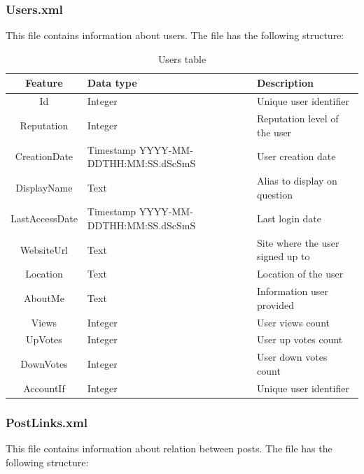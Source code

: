 \documentclass[11pt]{article} %
\begin{document}
    \subsubsection{Users.xml}

      This file contains information about users. The file has the following structure:

      \begin{table}[!h]
        \begin{tabular}{|c|p{}|p{}|}
          \hline

          Feature & Data type & Description \\ \hline
          Id & Integer & Unique user identifier \\
          Reputation & Integer & Reputation level of the user \\ \hline
          CreationDate & Timestamp YYYY-MM-DDTHH:MM:SS.dScSmS & User creation date \\ \hline
          DisplayName & Text & Alias to display on question \\ \hline
          LastAccessDate & Timestamp YYYY-MM-DDTHH:MM:SS.dScSmS & Last login date \\ \hline
          WebsiteUrl & Text & Site where the user signed up to \\ \hline
          Location & Text & Location of the user \\ \hline
          AboutMe & Text & Information user provided \\ \hline
          Views & Integer & User views count \\ \hline
          UpVotes & Integer & User up votes count \\ \hline
          DownVotes & Integer & User down votes count \\ \hline
          AccountIf & Integer & Unique user identifier \\

          \hline
        \end{tabular}
        \caption{Users table}
        \label{tab:users}
      \end{table}

    \subsubsection{PostLinks.xml}

      This file contains information about relation between posts. The file has the following structure:
\end{document}
